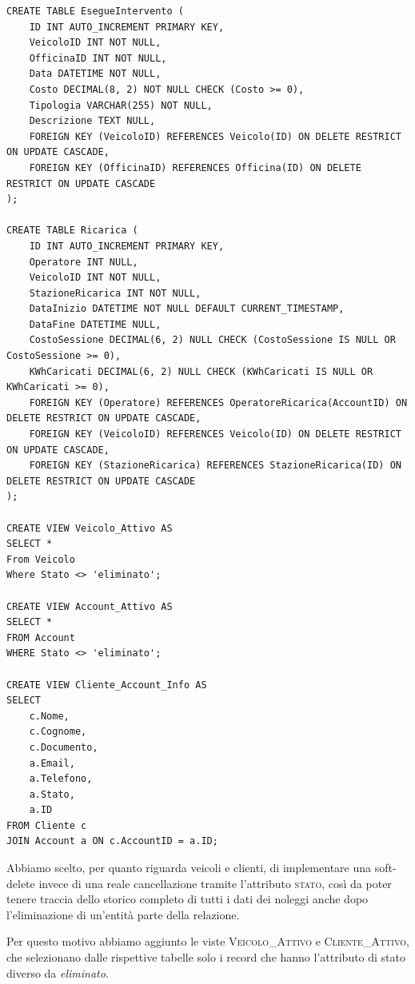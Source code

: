 \documentclass{article}
\begin{document}
\begin{lstlisting}
CREATE TABLE EsegueIntervento ( 
    ID INT AUTO_INCREMENT PRIMARY KEY,
    VeicoloID INT NOT NULL,
    OfficinaID INT NOT NULL,
    Data DATETIME NOT NULL,
    Costo DECIMAL(8, 2) NOT NULL CHECK (Costo >= 0),
    Tipologia VARCHAR(255) NOT NULL, 
    Descrizione TEXT NULL,
    FOREIGN KEY (VeicoloID) REFERENCES Veicolo(ID) ON DELETE RESTRICT ON UPDATE CASCADE,
    FOREIGN KEY (OfficinaID) REFERENCES Officina(ID) ON DELETE RESTRICT ON UPDATE CASCADE
);

CREATE TABLE Ricarica (
    ID INT AUTO_INCREMENT PRIMARY KEY,
    Operatore INT NULL,
    VeicoloID INT NOT NULL,
    StazioneRicarica INT NOT NULL,
    DataInizio DATETIME NOT NULL DEFAULT CURRENT_TIMESTAMP,
    DataFine DATETIME NULL,
    CostoSessione DECIMAL(6, 2) NULL CHECK (CostoSessione IS NULL OR CostoSessione >= 0),
    KWhCaricati DECIMAL(6, 2) NULL CHECK (KWhCaricati IS NULL OR KWhCaricati >= 0),
    FOREIGN KEY (Operatore) REFERENCES OperatoreRicarica(AccountID) ON DELETE RESTRICT ON UPDATE CASCADE,
    FOREIGN KEY (VeicoloID) REFERENCES Veicolo(ID) ON DELETE RESTRICT ON UPDATE CASCADE,
    FOREIGN KEY (StazioneRicarica) REFERENCES StazioneRicarica(ID) ON DELETE RESTRICT ON UPDATE CASCADE
);

CREATE VIEW Veicolo_Attivo AS
SELECT *
From Veicolo
Where Stato <> 'eliminato';

CREATE VIEW Account_Attivo AS
SELECT *
FROM Account
WHERE Stato <> 'eliminato';

CREATE VIEW Cliente_Account_Info AS
SELECT 
    c.Nome, 
    c.Cognome, 
    c.Documento,
    a.Email,
    a.Telefono, 
    a.Stato,
    a.ID
FROM Cliente c
JOIN Account a ON c.AccountID = a.ID;

\end{lstlisting}


Abbiamo scelto, per quanto riguarda veicoli e clienti, di implementare una soft-delete invece di una reale cancellazione tramite l'attributo \textsc{stato}, così da poter tenere traccia dello storico completo di tutti i dati dei noleggi anche dopo l'eliminazione di un'entità parte della relazione.

Per questo motivo abbiamo aggiunto le viste \textsc{Veicolo\_Attivo} e \textsc{Cliente\_Attivo}, che selezionano dalle rispettive tabelle solo i record che hanno l'attributo di stato diverso da \textit{eliminato}.


\end{document}
